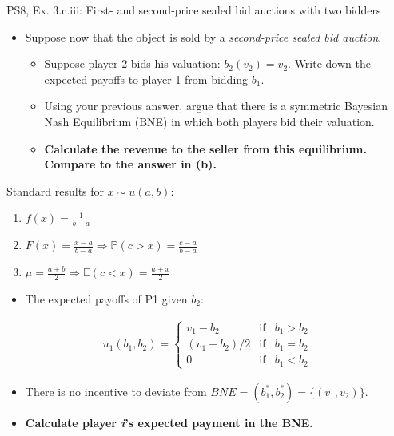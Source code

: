 \begin{frame}{PS8, Ex. 3.c.iii: First- and second-price sealed bid auctions with two bidders}
    \begin{multicols}{2}
      \begin{itemize}
        \item[(c)] Suppose now that the object is sold by a \textit{second-price sealed bid auction}.
        \begin{itemize}\normalsize
          \item[i.]   Suppose player 2 bids his valuation: $b_2(v_2) = v_2$. Write down the expected payoffs to player 1 from bidding $b_1$.
          \item[ii.]  Using your previous answer, argue that there is a symmetric Bayesian Nash Equilibrium (BNE) in which both players bid their valuation.
          \item[iii.] \textbf{Calculate the revenue to the seller from this equilibrium. Compare to the answer in (b).}
        \end{itemize}
      \end{itemize}
      Standard results for $x\sim u(a, b):$
      \vspace{-6pt}
      \begin{enumerate}
        \item[PDF:] $f(x)=\frac{1}{b-a}$
        \item[CDF:] $F(x)=\frac{x-a}{b-a}\Rightarrow\mathbb{P}(c>x)=\frac{c-a}{b-a}$
        \item[Mean:] $\mu=\frac{a+b}{2}\Rightarrow\mathbb{E}(c<x)=\frac{a+x}{2}$
      \end{enumerate}
      \vfill\null\columnbreak
      \begin{itemize}
        \item[(i)] The expected payoffs of P1 given $b_2$:
      \end{itemize}
      \vspace{-16pt}
      \begin{align*}
        u_1(b_1,b_2)=\left\{\begin{array}{lcl}
          v_1-b_2     & \text{if} & b_1>b_2 \\
          (v_1-b_2)/2 & \text{if} & b_1=b_2 \\
          0           & \text{if} & b_1<b_2
        \end{array}\right.
      \end{align*}
      \vspace{-18pt}
      \begin{itemize}
        \item[(ii)] There is no incentive to deviate from $BNE=(b_1^*,b_2^*)=\{(v_1,v_2)\}$.
        \item[(iii)] \textbf{Calculate player \textit{i}'s expected payment in the BNE.}
      \end{itemize}
      \vfill\null
    \end{multicols}
\end{frame}
